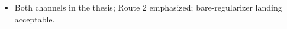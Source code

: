 \begin{itemize}
    \item Both channels in the thesis; Route 2 emphasized; bare-regularizer landing acceptable. 

\end{itemize}
